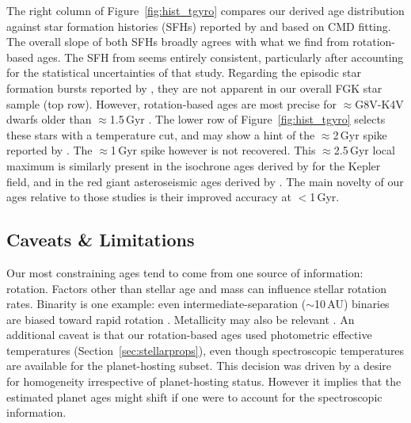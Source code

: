 \documentclass[11pt,twocolumn,tighten,linenumbers]{aastex63}
\begin{document}
The right column of Figure~\ref{fig:hist_tgyro} compares our derived
age distribution against star formation histories (SFHs) reported by
\citet{2019A&A...624L...1M} and \citet{2020NatAs...4..965R} based on
CMD fitting.  The overall slope of both SFHs broadly agrees with what
we find from rotation-based ages.  The SFH from
\citet{2019A&A...624L...1M} seems entirely consistent, particularly
after accounting for the statistical uncertainties of that study.
Regarding the episodic star formation bursts reported by
\citet{2020NatAs...4..965R}, they are not apparent in our overall FGK
star sample (top row).  However, rotation-based ages are most precise
for $\approx$G8V-K4V dwarfs older than $\approx$1.5\,Gyr
\citep{Bouma_2023}.  The lower row of Figure~\ref{fig:hist_tgyro}
selects these stars with a temperature cut, and may show a hint of the
$\approx$2\,Gyr spike reported by \citet{2020NatAs...4..965R}.  The
$\approx$1\,Gyr spike however is not recovered.  This
$\approx$2.5\,Gyr local maximum is similarly present in the isochrone
ages derived by \citet{Berger_2020a_catalog} for the Kepler field, and
in the red giant asteroseismic ages derived by
\citet{SilvaAguirre2018}.  The main novelty of our ages relative to
those studies is their improved accuracy at $<$1\,Gyr.


\subsection{Caveats \& Limitations}

Our most constraining ages tend to come from one source of
information: rotation.  Factors other than stellar age and mass can
influence stellar rotation rates.  Binarity is one example: even
intermediate-separation ($\sim$10\,AU) binaries are biased toward
rapid rotation \citep[e.g.][and many studies thereafter]{Meibom_2007}.
Metallicity may also be relevant
\citep{2020MNRAS.499.3481A,2024arXiv240500779S}.  An additional caveat
is that our rotation-based ages used photometric effective
temperatures (Section~\ref{sec:stellarprops}), even though
spectroscopic temperatures are available for the planet-hosting
subset.  This decision was driven by a desire for homogeneity 
irrespective of planet-hosting status.  However it implies that the
estimated planet ages might shift if one were to account for the
spectroscopic information.
\end{document}
